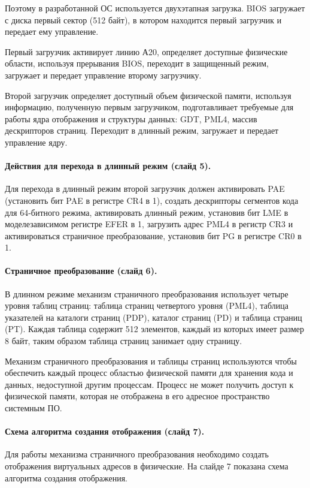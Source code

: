 \documentclass[12pt]{article}
\begin{document}
Поэтому в разработанной ОС используется двухэтапная загрузка. BIOS загружает с диска
первый сектор (512 байт), в котором находится первый загрузчик и передает ему управление.

Первый загрузчик активирует линию А20, определяет доступные физические области, используя
прерывания BIOS, переходит в защищенный режим, загружает и передает управление второму
загрузчику.

Второй загрузчик определяет доступный объем физической памяти, используя информацию, полученную
первым загрузчиком, подготавливает требуемые для работы ядра отображения и структуры данных:
GDT, PML4, массив дескрипторов страниц. Переходит в длинный режим, загружает и передает
управление ядру.

\paragraph{Действия для перехода в длинный режим (слайд 5).}
Для перехода в длинный режим второй загрузчик должен активировать PAE (установить бит PAE в регистре
CR4 в 1), создать дескрипторы сегментов кода для 64-битного режима, активировать длинный режим,
установив бит LME в моделезависимом регистре EFER в 1, загрузить адрес PML4 в регистр CR3 и
активироваться страничное преобразование, установив бит PG в регистре CR0 в 1.

\paragraph{Страничное преобразование (слайд 6).}
В длинном режиме механизм страничного преобразования использует четыре уровня таблиц страниц:
таблица страниц четвертого уровня (PML4), таблица указателей на каталоги страниц (PDP),
каталог страниц (PD) и таблица страниц (PT). Каждая таблица содержит 512 элементов, каждый из
которых имеет размер 8 байт, таким образом таблица страниц занимает одну страницу.

Механизм страничного преобразования и таблицы страниц используются чтобы обеспечить
каждый процесс областью физической памяти для хранения кода и данных, недоступной другим процессам.
Процесс не может получить доступ к физической памяти, которая не отображена в его адресное
пространство системным ПО.

\paragraph{Схема алгоритма создания отображения (слайд 7).}
Для работы механизма страничного преобразования необходимо создать отображения виртуальных адресов в
физические. На слайде 7 показана схема алгоритма создания отображения.
\end{document}
